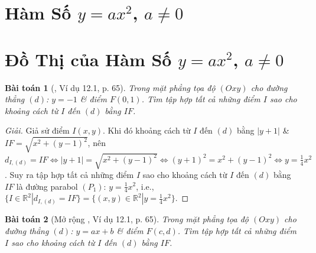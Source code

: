 \documentclass{article}
\newtheorem{baitoan}{Bài toán}
\begin{document}
\section{Hàm Số $y = ax^2$, $a\ne0$}

\noindent{}


\section{Đồ Thị của Hàm Số $y = ax^2$, $a\ne0$}

\begin{baitoan}[\cite{TLCT_THCS_Toan_9_dai_so}, Ví dụ 12.1, p. 65]
	Trong mặt phẳng tọa độ $(Oxy)$ cho đường thẳng $(d)$: $y = -1$ \& điểm $F(0,1)$. Tìm tập hợp tất cả những điểm $I$ sao cho khoảng cách từ $I$ đến $(d)$ bằng $IF$.
\end{baitoan}

\begin{proof}[Giải]
	Giả sử điểm $I(x,y)$. Khi đó khoảng cách từ $I$ đến $(d)$ bằng $|y + 1|$ \& $IF = \sqrt{x^2 + (y - 1)^2}$, nên $d_{I,(d)} = IF\Leftrightarrow|y + 1| = \sqrt{x^2 + (y - 1)^2}\Leftrightarrow(y + 1)^2 = x^2 + (y - 1)^2\Leftrightarrow y = \frac{1}{4}x^2$. Suy ra tập hợp tất cả những điểm $I$ sao cho khoảng cách từ $I$ đến $(d)$ bằng $IF$ là đường parabol $(P_1)$: $y = \frac{1}{4}x^2$, i.e., $\{I\in\mathbb{R}^2|d_{I,(d)} = IF\} = \{(x,y)\in\mathbb{R}^2|y = \frac{1}{4}x^2\}$.
\end{proof}

\begin{baitoan}[Mở rộng \cite{TLCT_THCS_Toan_9_dai_so}, Ví dụ 12.1, p. 65]
	Trong mặt phẳng tọa độ $(Oxy)$ cho đường thẳng $(d)$: $y = ax + b$ \& điểm $F(c,d)$. Tìm tập hợp tất cả những điểm $I$ sao cho khoảng cách từ $I$ đến $(d)$ bằng $IF$.
\end{baitoan}
\end{document}
